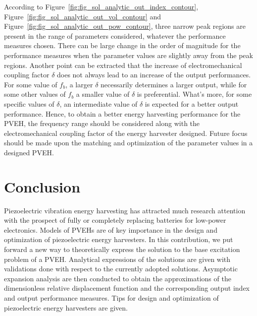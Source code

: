 \documentclass{svjour3}                     %
\begin{document}
According to Figure~\ref{fig:fig_sol_analytic_out_index_contour}, Figure~\ref{fig:fig_sol_analytic_out_vol_contour} and Figure~\ref{fig:fig_sol_analytic_out_pow_contour}, three narrow peak regions are present in the range of parameters considered, whatever the performance measures chosen. There can be large change in the order of magnitude for the performance measures when the parameter values are slightly away from the peak regions. Another point can be extracted that the increase of electromechanical coupling factor $\delta$ does not always lead to an increase of the output performances. For some value of $f_b$, a larger $\delta$ necessarily determines a larger output, while for some other values of $f_b$ a smaller value of $\delta$ is preferential. What's more, for some specific values of $\delta$, an intermediate value of $\delta$ is expected for a better output performance. Hence, to obtain a better energy harvesting performance for the PVEH, the frequency range should be considered along with the electromechanical coupling factor of the energy harvester designed. Future focus should be made upon the matching and optimization of the parameter values in a designed PVEH.


\section{Conclusion}

Piezoelectric vibration energy harvesting has attracted much research attention with the prospect of fully or completely replacing batteries for low-power electronics. Models of PVEHs are of key importance in the design and optimization of piezoelectric energy harvesters. In this contribution, we put forward a new way to theoretically express the solution to the base excitation problem of a PVEH. Analytical expressions of the solutions are given with validations done with respect to the currently adopted solutions. Asymptotic expansion analysis are then conducted to obtain the approximations of the dimensionless relative displacement function and the corresponding output index and output performance measures. Tips for design and optimization of piezoelectric energy harvesters are given. 
\end{document}
